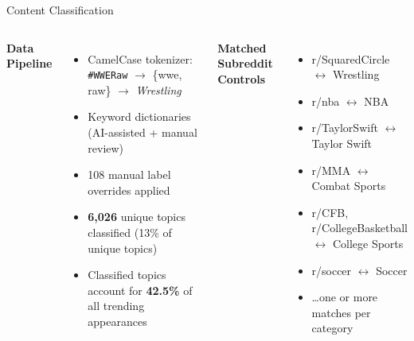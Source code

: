 \documentclass[aspectratio=169,t]{beamer}
\newcommand{\orange}[1]{\textcolor{uteporange}{\textbf{#1}}}
\newcommand{\blue}[1]{\textcolor{utepblue}{\textbf{#1}}}
\begin{document}
\begin{frame}{Content Classification}
\begin{columns}[T]
    \blue{Data Pipeline}
    \begin{itemize}\setlength\itemsep{0.35em}\small
      \item CamelCase tokenizer:\\
            \texttt{\#WWERaw} $\to$ \{wwe, raw\} $\to$ \textit{Wrestling}
      \item Keyword dictionaries (AI-assisted + manual review)
      \item 108 manual label overrides applied
      \item \orange{6,026} unique topics classified (13\% of unique topics)
      \item Classified topics account for \orange{42.5\%} of all trending appearances
            
    \end{itemize}

    \blue{Matched Subreddit Controls}
    \begin{itemize}\setlength\itemsep{0.35em}\small
      \item r/SquaredCircle $\leftrightarrow$ Wrestling
      \item r/nba $\leftrightarrow$ NBA
      \item r/TaylorSwift $\leftrightarrow$ Taylor Swift
      \item r/MMA $\leftrightarrow$ Combat Sports
      \item r/CFB, r/CollegeBasketball $\leftrightarrow$ College Sports
      \item r/soccer $\leftrightarrow$ Soccer
      \item \ldots one or more matches per category
    \end{itemize}
\end{columns}
\end{frame}
\end{document}
